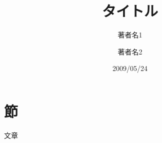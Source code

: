\documentclass[uplatex]{jarticle}
\title{タイトル}
\author{著者名1 \and 著者名2}
\date{2009/05/24}
\begin{document}
  \maketitle

  \section{節}
  文章
\end{document}
